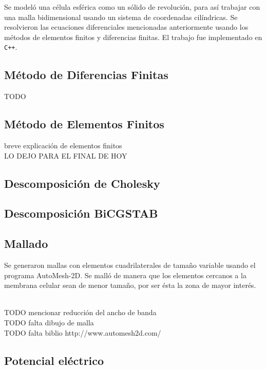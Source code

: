 \documentclass[a4paper,10pt]{article}
\begin{document}

Se modeló una célula esférica como un sólido de revolución, para así trabajar con una malla bidimensional usando un sistema de coordenadas cilíndricas. Se resolvieron las ecuaciones diferenciales mencionadas anteriormente usando los métodos de elementos finitos y diferencias finitas. El trabajo fue implementado en \texttt{C++}.

\subsection{Método de Diferencias Finitas}
TODO

\subsection{Método de Elementos Finitos}
breve explicación de elementos finitos 
\\LO DEJO PARA EL FINAL DE HOY

\subsection{Descomposición de Cholesky}

\subsection{Descomposición BiCGSTAB}

\subsection{Mallado}
Se generaron mallas con elementos cuadrilaterales de tamaño variable usando el programa AutoMesh-2D. Se malló de manera que los elementos cercanos a la membrana celular sean de menor tamaño, por ser ésta la zona de mayor interés. 

\\TODO mencionar reducción del ancho de banda
\\TODO falta dibujo de malla
\\TODO falta biblio http://www.automesh2d.com/

\subsection{Potencial eléctrico}
\end{document}
